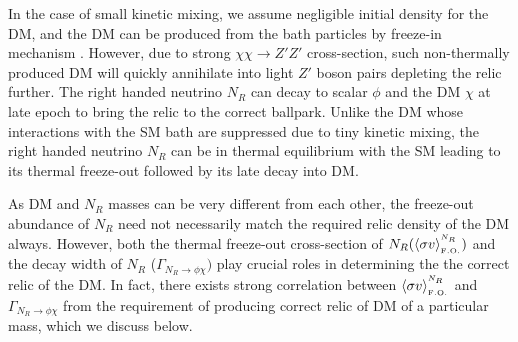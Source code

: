 \documentclass[prd,nofootinbib,preprint,superscriptaddress]{revtex4}
\begin{document}
		In the case of small kinetic mixing, we assume negligible initial density for the DM, and the DM can be produced from the bath particles by freeze-in mechanism \cite{Hall:2009bx}. However, due to strong $\chi \chi \to Z'Z'$ cross-section, such non-thermally produced DM will quickly annihilate into light $Z'$ boson pairs depleting the relic further. The right handed neutrino $N_R$ can decay to scalar $\phi$ and the DM $\chi$ at late epoch to bring the relic to the correct ballpark. Unlike the DM whose interactions with the SM bath are suppressed due to tiny kinetic mixing, the right handed neutrino $N_R$ can be in thermal equilibrium with the SM leading to its thermal freeze-out followed by its late decay into DM.
		
		As DM and $N_R$ masses can be very different from each other, the freeze-out abundance of $N_R$ need not necessarily match the required relic density of the DM always. However, both the thermal freeze-out cross-section of $N_R (\langle\sigma v \rangle^{^{N_R}}_{_{ \rm F.O.}})$ and the decay width of $N_R$ ($\Gamma_{N_{R} \to \phi \chi})$ play crucial roles in determining the the correct relic of the DM. In fact, there exists strong correlation between $\langle\sigma v \rangle^{^{N_R}}_{_{ \rm F.O.}}$ and $\Gamma_{N_{R} \to \phi \chi}$ from the requirement of producing correct relic of DM of a particular mass, which we discuss below.
		
\end{document}
